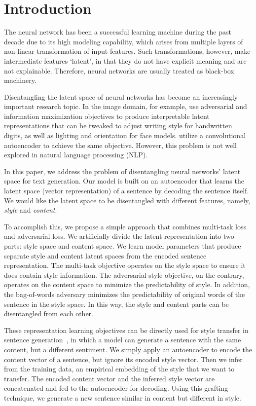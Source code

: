 \documentclass[11pt,a4paper]{article}
\begin{document}
\section{Introduction}

The neural network has been a successful learning machine during the past decade due to its high modeling capability, which arises from multiple layers of non-linear transformation of input features. Such transformations, however, make intermediate features `latent', in that they do not have explicit meaning and are not explainable. Therefore, neural networks are usually treated as black-box machinery.

Disentangling the latent space of neural networks has become an increasingly important research topic. In the image domain, for example, \citet{chen2016infogan} use adversarial and information maximization objectives to produce interpretable latent representations that can be tweaked to adjust writing style for handwritten digits, as well as lighting and orientation for face models. \citet{mathieu2016disentangling} utilize a convolutional autoencoder to achieve the same objective. However, this problem is not well explored in natural language processing (NLP).

In this paper, we address the problem of disentangling neural networks' latent space for text generation. Our model is built on an autoencoder that learns the latent space (vector representation) of a sentence by decoding the sentence itself. We would like the latent space to be disentangled with different features, namely, \textit{style} and \textit{content}.

To accomplish this, we propose a simple approach that combines multi-task loss and adversarial loss. We artificially divide the latent representation into two parts: style space and content space. We learn model parameters that produce separate style and content latent spaces from the encoded sentence representation. The multi-task objective operates on the style space to ensure it does contain style information. The adversarial style objective, on the contrary, operates on the content space to minimize the predictability of style. In addition, the bag-of-words adversary minimizes the predictability of original words of the sentence in the style space. In this way, the style and content parts can be disentangled from each other.

These representation learning objectives can be directly used for style transfer in sentence generation~\cite{hu2017toward,shen2017style,fu2017style}, in which a model can generate a sentence with the same content, but a different sentiment. We simply apply an autoencoder to encode the content vector of a sentence, but ignore its encoded style vector. Then we infer from the training data, an empirical embedding of the style that we want to transfer. The encoded content vector and the inferred style vector are concatenated and fed to the autoencoder for decoding. Using this grafting technique, we generate a new sentence similar in content but different in style.
\end{document}
